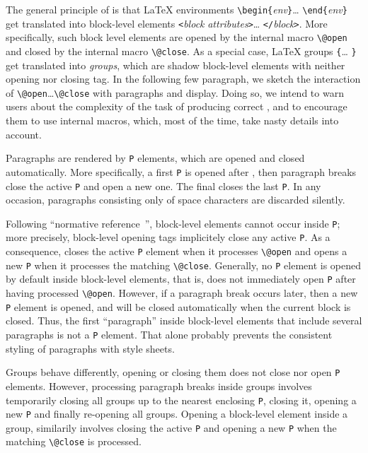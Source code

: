 The general principle of \hevea{} is that \LaTeX{} environments
\verb+\begin{+\textit{env}\verb+}+\ldots{}
\verb+\end{+\textit{env}\verb+}+ get
translated into \html{} block-level elements \verb+<+\textit{block}
\textit{attributes}\verb+>+\ldots{} \verb+</+\textit{block}\verb+>+.
More specifically, such block level elements are opened by the
internal macro \verb+\@open+ and closed by the internal macro
\verb+\@close+.
As a special case, \LaTeX{} groups \verb+{+\ldots{} \verb+}+
get translated into \html{} \emph{groups}, which are shadow block-level
elements with neither opening nor closing tag.
In the following few paragraph, we sketch the interaction of
\verb+\@open+\ldots\verb+\@close+ with paragraphs and display.
Doing so, we intend to warn users about the complexity
of the task of producing correct \html{}, and to encourage
them to use internal macros, which, most of the time, take nasty
details into account.

Paragraphs are rendered by \verb+P+ elements, which are opened and
closed automatically.
More specifically, a first \verb+P+ is opened after
\verb++, then paragraph breaks close the active
\verb+P+ and open a new one.
The final \verb++ closes the last \verb+P+.
In any occasion, paragraphs consisting only of space characters
are discarded silently.

Following \html{} ``normative reference~\cite{html}'', block-level
elements cannot occur inside \verb+P+; more precisely,
block-level opening tags implicitely close any active \verb+P+.
As a consequence,
\hevea{} closes the active \verb+P+ element when it processes
\verb+\@open+
and opens a new \verb+P+ when it processes the matching
\verb+\@close+.
Generally, no \verb+P+ element is opened by default inside block-level
elements, that is, \hevea{} does not immediately open \verb+P+ after having
processed \verb+\@open+.
However, if a paragraph break occurs later, then a new \verb+P+
element is opened, and will be closed automatically
when the current block is closed.
Thus, the first ``paragraph'' inside block-level elements
that include several paragraphs is not a \verb+P+ element.
That alone probably prevents the consistent styling
of paragraphs with style sheets.

Groups behave differently, opening or closing them does
not close nor open \verb+P+ elements.
However, processing paragraph breaks inside groups involves temporarily
closing all groups up to the nearest enclosing \verb+P+, closing it,
opening a new \verb+P+ and finally re-opening all groups.
Opening a block-level element inside a group, similarily
involves closing the active \verb+P+ and opening a new \verb+P+
when the matching \verb+\@close+ is processed.

